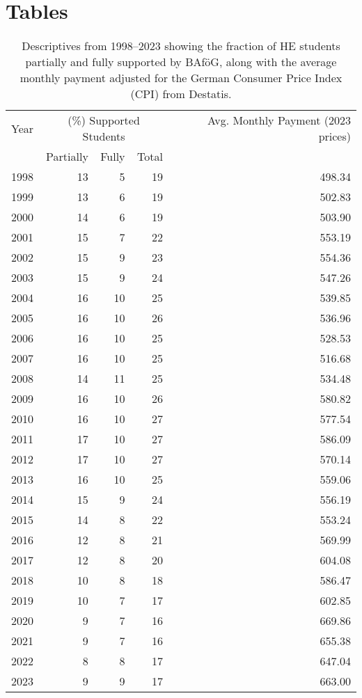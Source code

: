 \newpage
\section{Tables}
\renewcommand{\thetable}{\thesection \arabic{table}}
\setcounter{table}{0}


\begin{table}[H]
\centering
\renewcommand{\arraystretch}{0.8}  %
\begin{tabular}{lrrrr}
\hline
\hline
Year & \multicolumn{3}{c}{(\%) Supported Students} & Avg. Monthly Payment (2023 prices) \\
\cline{2-4}
     & Partially & Fully & Total & \\
\hline
1998 & 13 & 5 & 19 & 498.34 \\
1999 & 13 & 6 & 19 & 502.83 \\
2000 & 14 & 6 & 19 & 503.90 \\
2001 & 15 & 7 & 22 & 553.19 \\
2002 & 15 & 9 & 23 & 554.36 \\
2003 & 15 & 9 & 24 & 547.26 \\
2004 & 16 & 10 & 25 & 539.85 \\
2005 & 16 & 10 & 26 & 536.96 \\
2006 & 16 & 10 & 25 & 528.53 \\
2007 & 16 & 10 & 25 & 516.68 \\
2008 & 14 & 11 & 25 & 534.48 \\
2009 & 16 & 10 & 26 & 580.82 \\
2010 & 16 & 10 & 27 & 577.54 \\
2011 & 17 & 10 & 27 & 586.09 \\
2012 & 17 & 10 & 27 & 570.14 \\
2013 & 16 & 10 & 25 & 559.06 \\
2014 & 15 & 9 & 24 & 556.19 \\
2015 & 14 & 8 & 22 & 553.24 \\
2016 & 12 & 8 & 21 & 569.99 \\
2017 & 12 & 8 & 20 & 604.08 \\
2018 & 10 & 8 & 18 & 586.47 \\
2019 & 10 & 7 & 17 & 602.85 \\
2020 & 9 & 7 & 16 & 669.86 \\
2021 & 9 & 7 & 16 & 655.38 \\
2022 & 8 & 8 & 17 & 647.04 \\
2023 & 9 & 9 & 17 & 663.00 \\
\hline
\end{tabular}
\caption{
  Descriptives from 1998--2023 showing the fraction of HE students partially and fully 
  supported by BAföG, along with the average monthly payment adjusted for the German Consumer Price Index (CPI) from Destatis.
}
\label{tab:support_fraction_financial_expenditure}
\end{table}
